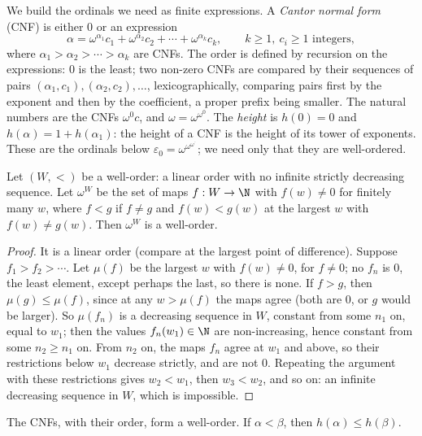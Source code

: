 We build the ordinals we need as finite expressions. A \emph{Cantor normal form} (CNF) is either $0$ or an expression
\[
\alpha=\omega^{\alpha_1}c_1+\omega^{\alpha_2}c_2+\cdots+\omega^{\alpha_k}c_k,\qquad k\ge1,\ c_i\ge1\text{ integers},
\]
where $\alpha_1>\alpha_2>\cdots>\alpha_k$ are CNFs. The order is defined by recursion on the expressions: $0$ is the least; two non-zero CNFs are compared by their sequences of pairs $(\alpha_1,c_1),(\alpha_2,c_2),\dots$, lexicographically, comparing pairs first by the exponent and then by the coefficient, a proper prefix being smaller. The natural numbers are the CNFs $\omega^0c$, and $\omega=\omega^{\omega^0}$. The \emph{height} is $h(0)=0$ and $h(\alpha)=1+h(\alpha_1)$: the height of a CNF is the height of its tower of exponents. These are the ordinals below $\varepsilon_0=\omega^{\omega^{\omega^{\cdot^{\cdot}}}}$; we need only that they are well-ordered.

\begin{lemma}\label{lem:omegaw}
Let $(W,<)$ be a well-order: a linear order with no infinite strictly decreasing sequence. Let $\omega^W$ be the set of maps $f:W\to\N$ with $f(w)\ne0$ for finitely many $w$, where $f<g$ if $f\ne g$ and $f(w)<g(w)$ at the largest $w$ with $f(w)\ne g(w)$. Then $\omega^W$ is a well-order.
\end{lemma}

\begin{proof}
It is a linear order (compare at the largest point of difference). Suppose $f_1>f_2>\cdots$. Let $\mu(f)$ be the largest $w$ with $f(w)\ne0$, for $f\ne0$; no $f_n$ is $0$, the least element, except perhaps the last, so there is none. If $f>g$, then $\mu(g)\le\mu(f)$, since at any $w>\mu(f)$ the maps agree (both are $0$, or $g$ would be larger). So $\mu(f_n)$ is a decreasing sequence in $W$, constant from some $n_1$ on, equal to $w_1$; then the values $f_n(w_1)\in\N$ are non-increasing, hence constant from some $n_2\ge n_1$ on. From $n_2$ on, the maps $f_n$ agree at $w_1$ and above, so their restrictions below $w_1$ decrease strictly, and are not $0$. Repeating the argument with these restrictions gives $w_2<w_1$, then $w_3<w_2$, and so on: an infinite decreasing sequence in $W$, which is impossible.
\end{proof}

\begin{proposition}\label{prop:cnfwellorder}
The CNFs, with their order, form a well-order. If $\alpha<\beta$, then $h(\alpha)\le h(\beta)$.
\end{proposition}

